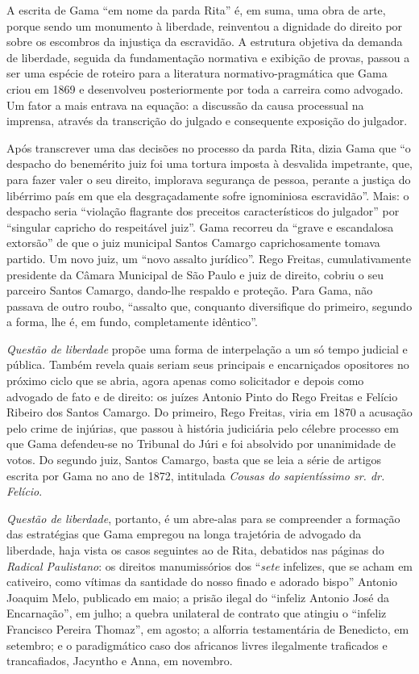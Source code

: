 A escrita de Gama ``em nome da parda Rita'' é, em suma, uma obra de arte,
porque sendo um monumento à liberdade, reinventou a dignidade do direito
por sobre os escombros da injustiça da escravidão. A estrutura objetiva
da demanda de liberdade, seguida da fundamentação normativa e exibição
de provas, passou a ser uma espécie de roteiro para a literatura
normativo-pragmática que Gama criou em 1869 e desenvolveu posteriormente
por toda a carreira como advogado. Um fator a mais entrava na equação: a
discussão da causa processual na imprensa, através da transcrição do
julgado e consequente exposição do julgador.

Após transcrever uma das decisões no processo da parda Rita, dizia Gama
que ``o despacho do benemérito juiz foi uma tortura imposta à desvalida
impetrante, que, para fazer valer o seu direito, implorava segurança de
pessoa, perante a justiça do libérrimo país em que ela desgraçadamente
sofre ignominiosa escravidão''. Mais: o despacho seria ``violação
flagrante dos preceitos característicos do julgador'' por ``singular
capricho do respeitável juiz''. Gama recorreu da ``grave e escandalosa
extorsão'' de que o juiz municipal Santos Camargo caprichosamente tomava
partido. Um novo juiz, um ``novo assalto jurídico''. Rego Freitas,
cumulativamente presidente da Câmara Municipal de São Paulo e juiz de
direito, cobriu o seu parceiro Santos Camargo, dando-lhe respaldo e
proteção. Para Gama, não passava de outro roubo, ``assalto que, conquanto
diversifique do primeiro, segundo a forma, lhe é, em fundo,
completamente idêntico''.

\emph{Questão de liberdade} propõe uma forma de interpelação a um só
tempo judicial e pública. Também revela quais seriam seus principais e
encarniçados opositores no próximo ciclo que se abria, agora apenas como
solicitador e depois como advogado de fato e de direito: os juízes
Antonio Pinto do Rego Freitas e Felício Ribeiro dos Santos Camargo. Do
primeiro, Rego Freitas, viria em 1870 a acusação pelo crime de injúrias,
que passou à história judiciária pelo célebre processo em que Gama
defendeu-se no Tribunal do Júri e foi absolvido por unanimidade de
votos. Do segundo juiz, Santos Camargo, basta que se leia a série de
artigos escrita por Gama no ano de 1872, intitulada \emph{Cousas do
sapientíssimo sr. dr. Felício}.

\emph{Questão de liberdade}, portanto, é um abre-alas para se
compreender a formação das estratégias que Gama empregou na longa
trajetória de advogado da liberdade, haja vista os casos seguintes ao de
Rita, debatidos nas páginas do \emph{Radical Paulistano}: os direitos
manumissórios dos ``\emph{sete} infelizes, que se acham em cativeiro,
como vítimas da santidade do nosso finado e adorado bispo'' Antonio
Joaquim Melo, publicado em maio; a prisão ilegal do ``infeliz Antonio
José da Encarnação'', em julho; a quebra unilateral de contrato que
atingiu o ``infeliz Francisco Pereira Thomaz'', em agosto; a alforria
testamentária de Benedicto, em setembro; e o paradigmático caso dos
africanos livres ilegalmente traficados e trancafiados, Jacyntho e Anna,
em novembro.

